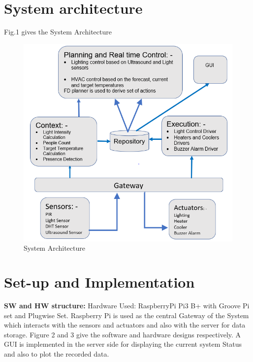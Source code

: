 \documentclass[runningheads]{llncs}
\begin{document}
\section{System architecture}
Fig.1 gives the System Architecture
\begin{figure}
\begin{center}
\includegraphics[scale=1]{fig1}
\caption{System Architecture}
\end{center}
\end{figure}
\section{Set-up and Implementation}

\textbf{SW and HW structure:}
Hardware Used: RaspberryPi Pi3 B+ with Groove Pi set and Plugwise Set.
Raspberry Pi is used as the central Gateway of the System which interacts with the sensors and actuators and also with the server for data storage. Figure 2 and 3 give the software and hardware designs respectively. A GUI is implemented in the server side for displaying the current system Status and also to plot the recorded data. 
\end{document}

